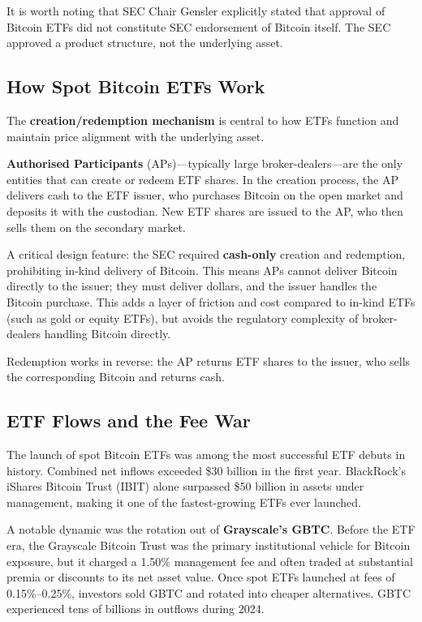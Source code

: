\documentclass[11pt,a4paper]{article}
\newcommand{\keyword}[1]{\textbf{\textcolor{AccentOrange}{#1}}}
\begin{document}
It is worth noting that SEC Chair Gensler explicitly stated that approval of Bitcoin ETFs did not constitute SEC endorsement of Bitcoin itself. The SEC approved a product structure, not the underlying asset.

\subsection{How Spot Bitcoin ETFs Work}

The \keyword{creation/redemption mechanism} is central to how ETFs function and maintain price alignment with the underlying asset.

\keyword{Authorised Participants} (APs)---typically large broker-dealers---are the only entities that can create or redeem ETF shares. In the creation process, the AP delivers cash to the ETF issuer, who purchases Bitcoin on the open market and deposits it with the custodian. New ETF shares are issued to the AP, who then sells them on the secondary market.

A critical design feature: the SEC required \keyword{cash-only} creation and redemption, prohibiting in-kind delivery of Bitcoin. This means APs cannot deliver Bitcoin directly to the issuer; they must deliver dollars, and the issuer handles the Bitcoin purchase. This adds a layer of friction and cost compared to in-kind ETFs (such as gold or equity ETFs), but avoids the regulatory complexity of broker-dealers handling Bitcoin directly.

Redemption works in reverse: the AP returns ETF shares to the issuer, who sells the corresponding Bitcoin and returns cash.

\subsection{ETF Flows and the Fee War}

The launch of spot Bitcoin ETFs was among the most successful ETF debuts in history. Combined net inflows exceeded \$30 billion in the first year. BlackRock's iShares Bitcoin Trust (IBIT) alone surpassed \$50 billion in assets under management, making it one of the fastest-growing ETFs ever launched.

A notable dynamic was the rotation out of \keyword{Grayscale's GBTC}. Before the ETF era, the Grayscale Bitcoin Trust was the primary institutional vehicle for Bitcoin exposure, but it charged a 1.50\% management fee and often traded at substantial premia or discounts to its net asset value. Once spot ETFs launched at fees of 0.15\%--0.25\%, investors sold GBTC and rotated into cheaper alternatives. GBTC experienced tens of billions in outflows during 2024.
\end{document}
